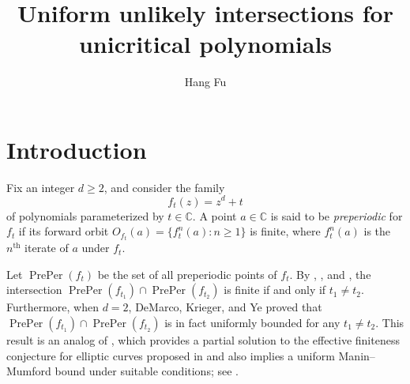 \documentclass[11pt]{amsart}
\title{Uniform unlikely intersections for unicritical polynomials}
\author{Hang Fu}
\numberwithin{equation}{section}
\theoremstyle{plain}
\theoremstyle{definition}
\theoremstyle{remark}
\DeclareMathOperator{\PrePer}{PrePer}
\newcommand{\C}{\mathbb C}
\newcommand{\supth}[1]{\ensuremath{#1^{\mathrm{th}}}}
\begin{document}


\maketitle


\begin{prelims}

\DisplayAbstractInEnglish

\bigskip

\DisplayKeyWords

\medskip

\DisplayMSCclass

\end{prelims}



\newpage

\setcounter{tocdepth}{1}

\tableofcontents




\section{Introduction}\label{sec1}

Fix an integer $d\geq2$, and consider the family 
\[
f_{t}(z)=z^{d}+t
\]
of polynomials parameterized by $t\in\C$. A
point $a\in\C$ is said to be \textit{preperiodic} for $f_{t}$
if its forward orbit $O_{f_{t}}(a)=\{f_{t}^{n}(a):n\geq1\}$ is finite,
where $f_{t}^{n}(a)$ is the $\supth{n}$ iterate of $a$ under $f_{t}$.

Let $\PrePer(f_{t})$ be the set of all preperiodic points of
$f_{t}$. By \cite[Section 4]{Be}, \cite[Theorem 1.2 and Corollary 1.3]{BD1},
and \cite[Theorem 1.3]{YZ}, the intersection $\PrePer(f_{t_{1}})\cap\PrePer(f_{t_{2}})$
is finite if and only if $t_{1}\neq t_{2}$. Furthermore, when $d=2$,
DeMarco, Krieger, and Ye \cite[Theorem 1.1]{DKY2} proved that $\PrePer(f_{t_{1}})\cap\PrePer(f_{t_{2}})$
is in fact uniformly bounded for any $t_{1}\neq t_{2}$. This result
is an analog of \cite[Theorem 1.4]{DKY1}, which provides a partial
solution to the effective finiteness conjecture for elliptic curves
proposed in \cite{BFT} and also implies a uniform Manin--Mumford
bound under suitable conditions; see \cite[Theorem 1.1]{DKY1}.
\end{document}
